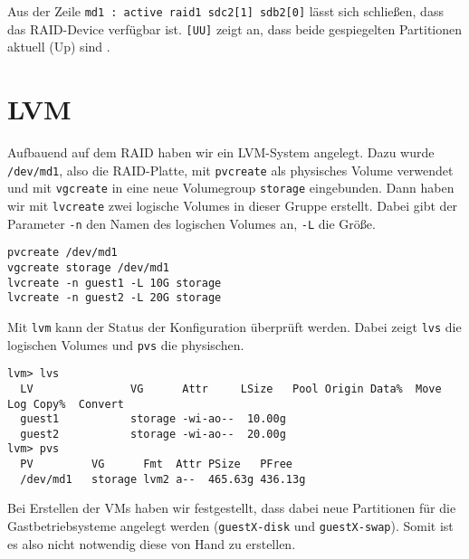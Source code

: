 Aus der Zeile \verb#md1 : active raid1 sdc2[1] sdb2[0]# lässt sich schließen, dass das RAID-Device verfügbar ist. \verb#[UU]# zeigt an, dass beide gespiegelten Partitionen aktuell (Up) sind \cite{wiki_mdstat}.

\section{LVM}
Aufbauend auf dem RAID haben wir ein LVM-System angelegt. Dazu wurde \verb#/dev/md1#, also die RAID-Platte, mit \verb#pvcreate# als physisches Volume verwendet und mit \verb#vgcreate# in eine neue Volumegroup \verb#storage# eingebunden. 
Dann haben wir mit \verb#lvcreate# zwei logische Volumes in dieser Gruppe erstellt. Dabei gibt der Parameter \verb#-n# den Namen des logischen Volumes an, \verb#-L# die Größe. 
\begin{verbatim}
pvcreate /dev/md1 
vgcreate storage /dev/md1
lvcreate -n guest1 -L 10G storage
lvcreate -n guest2 -L 20G storage
\end{verbatim} 
Mit \verb#lvm# kann der Status der Konfiguration überprüft werden. Dabei zeigt \verb#lvs# die logischen Volumes und \verb#pvs# die physischen. 
\setupVerbatimOut
{}
\begin{verbatim}
lvm> lvs
  LV               VG      Attr     LSize   Pool Origin Data%  Move Log Copy%  Convert                                        
  guest1           storage -wi-ao--  10.00g                                           
  guest2           storage -wi-ao--  20.00g                                           
lvm> pvs
  PV         VG      Fmt  Attr PSize   PFree  
  /dev/md1   storage lvm2 a--  465.63g 436.13g
\end{verbatim} 
Bei Erstellen der VMs haben wir festgestellt, dass dabei neue Partitionen für die Gastbetriebsysteme angelegt werden (\verb#guestX-disk# und \verb#guestX-swap#). Somit ist es also nicht notwendig diese von Hand zu erstellen. 

